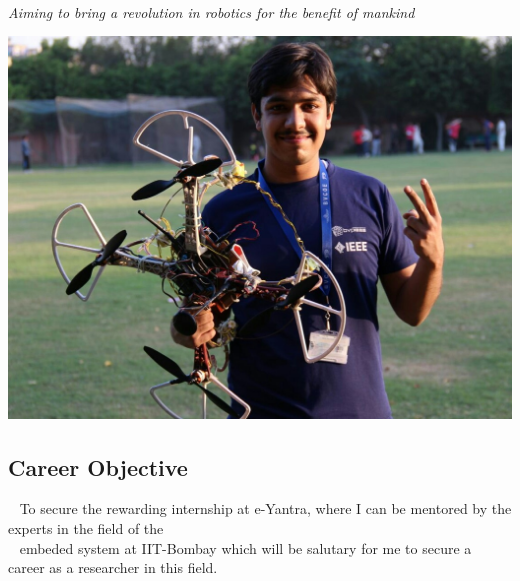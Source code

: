 \documentclass[11pt]{article}
\begin{document}
\begin{mdframed}[backgroundcolor=orange]
~
\begin{center}
\begin{Huge}
\end{Huge}
\end{center}
\begin{center}
\begin{large}
\color{white}\emph{Aiming to bring a revolution in robotics for the benefit of mankind}
\end{large}
\end{center}
\end{mdframed}
\begin{minipage}{1.00\linewidth}
\begin{center}
\includegraphics[scale=0.169]{siddhant_image}
\end{center}

\begin{flushleft}
\section{\color{red}Car\color{purple}e\color{black}er Obje\color{purple}ct\color{black}ive}
~
To secure the rewarding internship at e-Yantra, where I can be mentored by the experts in the field of the\\ ~ embeded system at IIT-Bombay which will be salutary for me to secure a career as a researcher in this field.

\end{flushleft}
\end{minipage}
\end{document}
